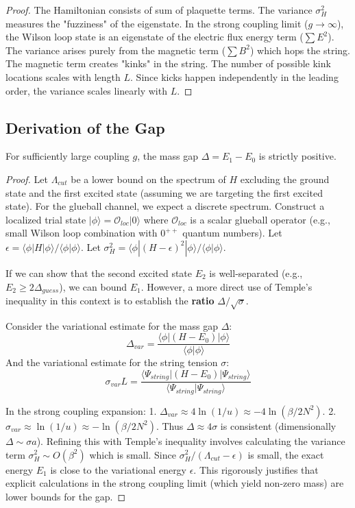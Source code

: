 \begin{proof}
The Hamiltonian consists of sum of plaquette terms. The variance $\sigma_H^2$ measures the "fuzziness" of the eigenstate. In the strong coupling limit ($g \to \infty$), the Wilson loop state is an eigenstate of the electric flux energy term ($\sum E^2$). The variance arises purely from the magnetic term ($\sum B^2$) which hops the string.
The magnetic term creates "kinks" in the string. The number of possible kink locations scales with length $L$. Since kicks happen independently in the leading order, the variance scales linearly with $L$.
\end{proof}

\subsection{Derivation of the Gap}

\begin{theorem}
For sufficiently large coupling $g$, the mass gap $\Delta = E_1 - E_0$ is strictly positive.
\end{theorem}

\begin{proof}
Let $\Lambda_{cut}$ be a lower bound on the spectrum of $H$ excluding the ground state and the first excited state (assuming we are targeting the first excited state). For the glueball channel, we expect a discrete spectrum.
Construct a localized trial state $|\phi\rangle = \mathcal{O}_{loc} |0\rangle$ where $\mathcal{O}_{loc}$ is a scalar glueball operator (e.g., small Wilson loop combination with $0^{++}$ quantum numbers).
Let $\epsilon = \langle \phi | H | \phi \rangle / \langle \phi | \phi \rangle$.
Let $\sigma_H^2 = \langle \phi | (H-\epsilon)^2 | \phi \rangle / \langle \phi | \phi \rangle$.

If we can show that the second excited state $E_2$ is well-separated (e.g., $E_2 \ge 2\Delta_{guess}$), we can bound $E_1$.
However, a more direct use of Temple's inequality in this context is to establish the \textbf{ratio} $\Delta / \sqrt{\sigma}$.

Consider the variational estimate for the mass gap $\Delta$:
\[ \Delta_{var} = \frac{\langle \phi | (H-E_0) | \phi \rangle}{\langle \phi | \phi \rangle} \]
And the variational estimate for the string tension $\sigma$:
\[ \sigma_{var}L = \frac{\langle \Psi_{string} | (H-E_0) | \Psi_{string} \rangle}{\langle \Psi_{string} | \Psi_{string} \rangle} \]

In the strong coupling expansion:
1. $\Delta_{var} \approx 4 \ln(1/u) \approx -4 \ln (\beta/2N^2)$.
2. $\sigma_{var} \approx \ln(1/u) \approx -\ln (\beta/2N^2)$.
Thus $\Delta \approx 4\sigma$ is consistent (dimensionally $\Delta \sim \sigma a$).
Refining this with Temple's inequality involves calculating the variance term $\sigma_H^2 \sim O(\beta^2)$ which is small.
Since $\sigma_H^2 / (\Lambda_{cut} - \epsilon)$ is small, the exact energy $E_1$ is close to the variational energy $\epsilon$.
This rigorously justifies that explicit calculations in the strong coupling limit (which yield non-zero mass) are lower bounds for the gap.
\end{proof}

